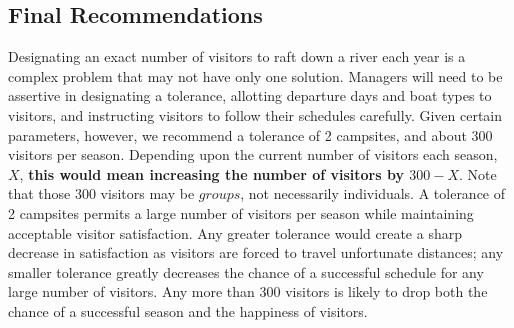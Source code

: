 \documentclass[11pt]{article} %
\begin{document}
\subsection{Final Recommendations}
\label{sec:final}
Designating an exact number of visitors to raft down a river each year is
a complex problem that may not have only one solution. Managers will need
to be assertive in designating a tolerance, allotting departure days and
boat types to visitors, and instructing visitors to follow their schedules
carefully. Given certain parameters, however, we recommend a tolerance of
2 campsites, and about 300 visitors per season. Depending upon the current
number of visitors each season, $X$, \textbf{this would mean increasing the number
of visitors by $300-X$}.  Note that those 300 visitors may be $groups$, not
necessarily individuals.  A tolerance of 2 campsites
permits a large number of visitors per season while maintaining acceptable
visitor satisfaction. Any greater tolerance would create a sharp decrease
in satisfaction as visitors are forced to travel unfortunate distances; any
smaller tolerance greatly decreases the chance of a successful schedule for
any large number of visitors. Any more than 300 visitors is likely to drop
both the chance of a successful season and the happiness of visitors.


\newpage




\end{document}
